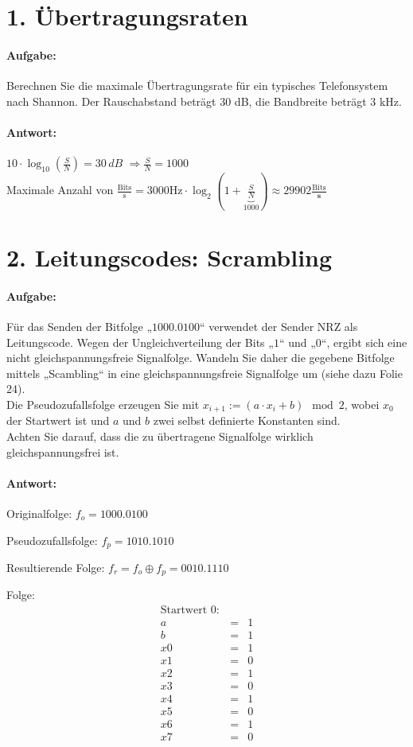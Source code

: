 \section{1. Übertragungsraten}
\paragraph{Aufgabe:}

	 Berechnen Sie die maximale Übertragungsrate für ein typisches Telefonsystem nach Shannon. Der Rauschabstand beträgt 30 dB, die Bandbreite beträgt 3 kHz.

\paragraph{Antwort:}

	$10 \cdot \log_{10}(\frac{S}{N})=30\, dB$
	 $\Longrightarrow \frac{S}{N} = 1000$
	\\Maximale Anzahl von $\frac{\text{Bits}}{\text{s}} =3000\text{Hz} \cdot \log_{2}(1+\underbrace{\frac{S}{N}}_\text{1000})  \approx 29902 \frac{\text{Bits}}{\textbf{s}}$


\section{2. Leitungscodes: Scrambling}
\paragraph{Aufgabe:}
		Für das Senden der Bitfolge „$1000.0100$“ verwendet der Sender NRZ als Leitungscode. Wegen der Ungleichverteilung der Bits „$1$“ und „$0$“, ergibt sich eine nicht gleichspannungsfreie Signalfolge.
		Wandeln Sie daher die gegebene Bitfolge mittels „Scambling“ in eine gleichspannungsfreie Signalfolge um (siehe dazu Folie 24).\\
		Die Pseudozufallsfolge erzeugen Sie mit $x_{i+1} := (a \cdot x_i+ b) \mod 2$, wobei $x_0$ der Startwert ist und $a$ und $b$ zwei selbst definierte Konstanten sind. \\
		Achten Sie darauf, dass die zu übertragene Signalfolge wirklich gleichspannungsfrei ist.

\paragraph{Antwort:}

Originalfolge:
$f_o =1000.0100$

Pseudozufallsfolge:
$f_p = 1010.1010$

Resultierende Folge:
$f_r = f_o \oplus f_p = 0010.1110$

Folge:
\begin{eqnarray*}        
\text{Startwert }0:&&\\
a &=& 1\\
b &=& 1\\
x0 &=& 1\\
x1 &=& 0\\
x2 &=& 1\\
x3 &=& 0\\
x4 &=& 1\\
x5 &=& 0\\
x6 &=& 1\\
x7 &=& 0\\
\end{eqnarray*}